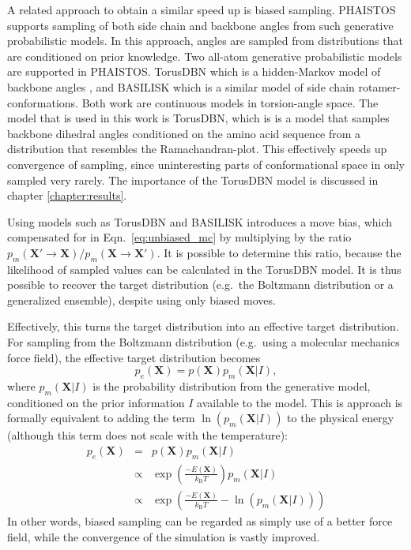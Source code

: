 A related approach to obtain a similar speed up is biased sampling.
PHAISTOS supports sampling of both side chain and backbone angles from such generative probabilistic models.
In this approach, angles are sampled from distributions that are conditioned on prior knowledge.
Two all-atom generative probabilistic models are supported in PHAISTOS.
TorusDBN which is a hidden-Markov model of backbone angles \cite{Torus08}, and BASILISK \cite{BASILISK} which is a similar model of side chain rotamer-conformations.
Both work are continuous models in torsion-angle space.
The model that is used in this work is TorusDBN, which is is a model that samples backbone dihedral angles conditioned on the amino acid sequence from a distribution that resembles the Ramachandran-plot.
This effectively speeds up convergence of sampling, since uninteresting parts of conformational space in only sampled very rarely.
The importance of the TorusDBN model is discussed in chapter \ref{chapter:results}.

Using models such as TorusDBN and BASILISK introduces a move bias, which compensated for in Eqn.~\ref{eq:unbiased_mc} by multiplying by the ratio $p_m(\mathbf{X'}     \rightarrow \mathbf{X}) / p_m(\mathbf{X} \rightarrow \mathbf{X'})$.
It is possible to determine this ratio, because the likelihood of sampled values can be calculated in the TorusDBN model.
It is thus possible to recover the target distribution (e.g.~the Boltzmann distribution or a generalized ensemble), despite using only biased moves.


Effectively, this turns the target distribution into an effective target distribution.
For sampling from the Boltzmann distribution (e.g.~using a molecular mechanics force field), the effective target distribution becomes
\begin{equation}
    p_e(\mathbf{X}) = p(\mathbf{X}) p_{m}(\mathbf{X}|I),
\end{equation}
where $p_{m}(\mathbf{X}|I)$ is the probability distribution from the generative model, conditioned on the prior information $I$ available to the model.
This is approach is formally equivalent to adding the term $\ln{(p_{m}(\mathbf{X}|I))}$ to the physical energy (although this term does not scale with the temperature):
\begin{eqnarray}
    p_e(\mathbf{X})
    &=& p(\mathbf{X}) p_{m}(\mathbf{X}|I) \nonumber\\
    &\propto& \exp{\left( \frac{-E(\mathbf{X})}{k_{\mathrm{B}}T} \right)}p_{m}(\mathbf{X}|I) \nonumber\\
    &\propto& \exp{\left( \frac{-E(\mathbf{X})}{k_{\mathrm{B}}T} - \ln{(p_{m}(\mathbf{X    }|I))}\right)}
\end{eqnarray}
In other words, biased sampling can be regarded as simply use of a better force field, while the convergence of the simulation is vastly improved.

